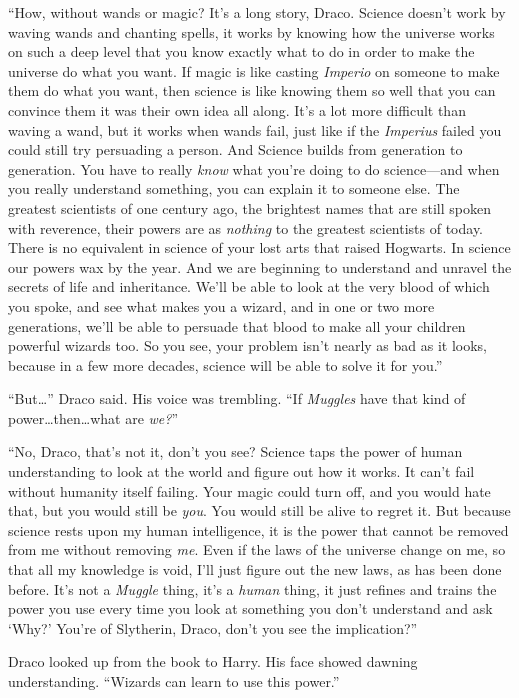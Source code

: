 “How, without wands or magic? It’s a long story, Draco. Science doesn’t work by waving wands and chanting spells, it works by knowing how the universe works on such a deep level that you know exactly what to do in order to make the universe do what you want. If magic is like casting \emph{Imperio} on someone to make them do what you want, then science is like knowing them so well that you can convince them it was their own idea all along. It’s a lot more difficult than waving a wand, but it works when wands fail, just like if the \emph{Imperius} failed you could still try persuading a person. And Science builds from generation to generation. You have to really \emph{know} what you’re doing to do science—and when you really understand something, you can explain it to someone else. The greatest scientists of one century ago, the brightest names that are still spoken with reverence, their powers are as \emph{nothing} to the greatest scientists of today. There is no equivalent in science of your lost arts that raised Hogwarts. In science our powers wax by the year. And we are beginning to understand and unravel the secrets of life and inheritance. We’ll be able to look at the very blood of which you spoke, and see what makes you a wizard, and in one or two more generations, we’ll be able to persuade that blood to make all your children powerful wizards too. So you see, your problem isn’t nearly as bad as it looks, because in a few more decades, science will be able to solve it for you.”

“But…” Draco said. His voice was trembling. “If \emph{Muggles} have that kind of power…then…what are \emph{we?}”

“No, Draco, that’s not it, don’t you see? Science taps the power of human understanding to look at the world and figure out how it works. It can’t fail without humanity itself failing. Your magic could turn off, and you would hate that, but you would still be \emph{you}. You would still be alive to regret it. But because science rests upon my human intelligence, it is the power that cannot be removed from me without removing \emph{me}. Even if the laws of the universe change on me, so that all my knowledge is void, I’ll just figure out the new laws, as has been done before. It’s not a \emph{Muggle} thing, it’s a \emph{human} thing, it just refines and trains the power you use every time you look at something you don’t understand and ask ‘Why?’ You’re of Slytherin, Draco, don’t you see the implication?”

Draco looked up from the book to Harry. His face showed dawning understanding. “Wizards can learn to use this power.”

